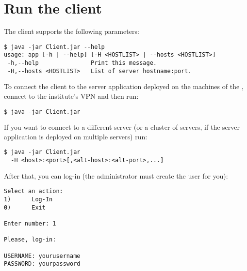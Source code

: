 \section{Run the client}\label{sec:clientrun}

The client supports the following parameters:

\begin{verbatim}
$ java -jar Client.jar --help
usage: app [-h | --help] [-H <HOSTLIST> | --hosts <HOSTLIST>]
 -h,--help               Print this message.
 -H,--hosts <HOSTLIST>   List of server hostname:port.
\end{verbatim}

To connect the client to the server application deployed on the machines of the
\theinstitute, connect to the institute's VPN and then run:

\begin{verbatim}
$ java -jar Client.jar
\end{verbatim}

If you want to connect to a different server (or a cluster of servers, if the
server application is deployed on multiple servers) run:

\begin{verbatim}
$ java -jar Client.jar
  -H <host>:<port>[,<alt-host>:<alt-port>,...]
\end{verbatim}

After that, you can log-in (the administrator must create the user for you):

\begin{verbatim}
Select an action:
1)      Log-In
0)      Exit

Enter number: 1

Please, log-in:

USERNAME: yourusername
PASSWORD: yourpassword
\end{verbatim}
